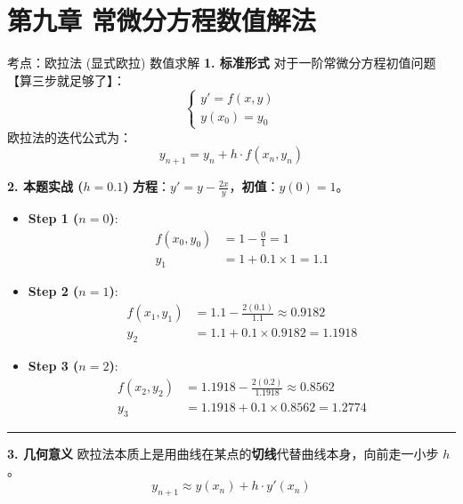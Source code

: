 \documentclass[12pt, a4paper]{article}
\begin{document}
\section*{第九章 常微分方程数值解法}
\begin{knowpoint}{考点：欧拉法 (显式欧拉) 数值求解}
    \textbf{1. 标准形式}
    对于一阶常微分方程初值问题【算三步就足够了】：
    \[
    \begin{cases}
        y' = f(x, y) \\
        y(x_0) = y_0
    \end{cases}
    \]
    欧拉法的迭代公式为：
    \[ \boxed{ y_{n+1} = y_n + h \cdot f(x_n, y_n) } \]

    \textbf{2. 本题实战 ($h=0.1$)}
    \textbf{方程}：$y' = y - \frac{2x}{y}$，\textbf{初值}：$y(0)=1$。

    \begin{itemize}
        \item \textbf{Step 1 ($n=0$)}: 
        \[ 
        \begin{aligned}
            f(x_0, y_0) &= 1 - \frac{0}{1} = 1 \\
            y_1 &= 1 + 0.1 \times 1 = \mathbf{1.1} 
        \end{aligned}
        \]
        
        \item \textbf{Step 2 ($n=1$)}: 
        \[ 
        \begin{aligned}
            f(x_1, y_1) &= 1.1 - \frac{2(0.1)}{1.1} \approx 0.9182 \\
            y_2 &= 1.1 + 0.1 \times 0.9182 = \mathbf{1.1918}
        \end{aligned}
        \]
        
        \item \textbf{Step 3 ($n=2$)}: 
        \[ 
        \begin{aligned}
            f(x_2, y_2) &= 1.1918 - \frac{2(0.2)}{1.1918} \approx 0.8562 \\
            y_3 &= 1.1918 + 0.1 \times 0.8562 = \mathbf{1.2774}
        \end{aligned}
        \]
    \end{itemize}

    \vspace{0.5em}
    \hrule
    \vspace{0.5em}

    \textbf{3. 几何意义}
    欧拉法本质上是用曲线在某点的\textbf{切线}代替曲线本身，向前走一小步 $h$。
    \[ y_{n+1} \approx y(x_n) + h \cdot y'(x_n) \]
\end{knowpoint}
\end{document}
